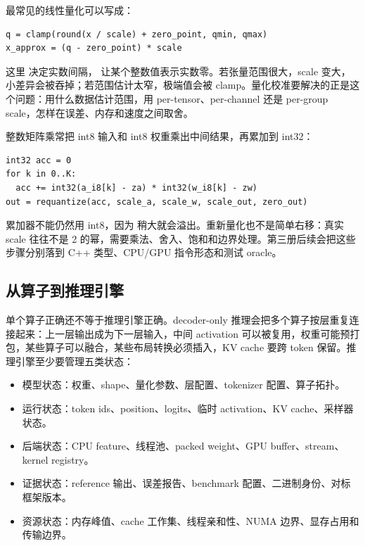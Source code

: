最常见的线性量化可以写成：

\begin{lstlisting}[numbers=none,caption={线性量化和反量化}]
q = clamp(round(x / scale) + zero_point, qmin, qmax)
x_approx = (q - zero_point) * scale
\end{lstlisting}

这里  决定实数间隔， 让某个整数值表示实数零。若张量范围很大，scale 变大，小差异会被吞掉；若范围估计太窄，极端值会被 clamp。量化校准要解决的正是这个问题：用什么数据估计范围，用 per-tensor、per-channel 还是 per-group scale，怎样在误差、内存和速度之间取舍。

整数矩阵乘常把 int8 输入和 int8 权重乘出中间结果，再累加到 int32：

\begin{lstlisting}[numbers=none,caption={int8 dot product 的累加器}]
int32 acc = 0
for k in 0..K:
  acc += int32(a_i8[k] - za) * int32(w_i8[k] - zw)
out = requantize(acc, scale_a, scale_w, scale_out, zero_out)
\end{lstlisting}

累加器不能仍然用 int8，因为  稍大就会溢出。重新量化也不是简单右移：真实 scale 往往不是 2 的幂，需要乘法、舍入、饱和和边界处理。第三册后续会把这些步骤分别落到 C++ 类型、CPU/GPU 指令形态和测试 oracle。

\subsection{从算子到推理引擎}

单个算子正确还不等于推理引擎正确。decoder-only 推理会把多个算子按层重复连接起来：上一层输出成为下一层输入，中间 activation 可以被复用，权重可能预打包，某些算子可以融合，某些布局转换必须插入，KV cache 要跨 token 保留。推理引擎至少要管理五类状态：

\begin{itemize}
  \item 模型状态：权重、shape、量化参数、层配置、tokenizer 配置、算子拓扑。
  \item 运行状态：token ids、position、logits、临时 activation、KV cache、采样器状态。
  \item 后端状态：CPU feature、线程池、packed weight、GPU buffer、stream、kernel registry。
  \item 证据状态：reference 输出、误差报告、benchmark 配置、二进制身份、对标框架版本。
  \item 资源状态：内存峰值、cache 工作集、线程亲和性、NUMA 边界、显存占用和传输边界。
\end{itemize}

